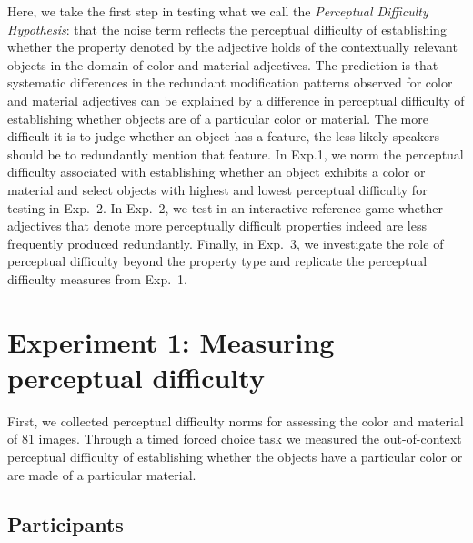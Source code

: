 \documentclass[12pt,letterpaper]{article}
\begin{document}
Here, we take the first step in testing what we call the \emph{Perceptual Difficulty Hypothesis}: that the noise term reflects the perceptual difficulty of establishing whether the property denoted by the adjective holds of the contextually relevant objects in the domain of color and material adjectives. The prediction is that systematic differences in the redundant modification patterns observed for color and material adjectives can be explained by a difference in perceptual difficulty of establishing whether objects are of a particular color or material. The more difficult it is to judge whether an object has a feature, the less likely speakers should be to redundantly mention that feature. In Exp.1, we norm the perceptual difficulty associated with establishing whether an object exhibits a color or material and select objects with highest and lowest perceptual difficulty for testing in Exp.~2. In Exp.~2, we test in an interactive reference game whether adjectives that denote more perceptually difficult properties indeed are less frequently produced redundantly. Finally, in Exp.~3, we investigate the role of perceptual difficulty beyond the property type and replicate the perceptual difficulty measures from Exp.~1.


\section{Experiment 1: Measuring perceptual difficulty} 

First, we collected perceptual difficulty norms for assessing the color and material  of 81 images. Through a timed forced choice task we measured the out-of-context perceptual difficulty of establishing whether the objects have a particular color or are made of a particular material.

\subsection{Participants} 
\end{document}
